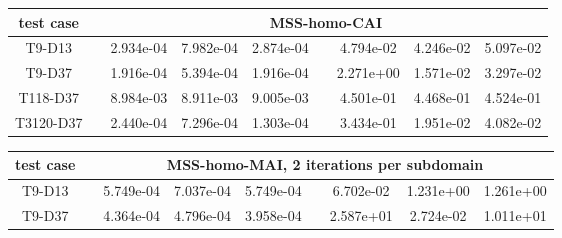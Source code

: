 \begin{table}[h]
\begin{adjustbox}{width=1\textwidth} %
\small
\begin{tabular}{ccccccccc}
\toprule
{test case} && \multicolumn{7}{c}{MSS-homo-CAI}   \\
\midrule
T9-D13       &&  2.934e-04 &  7.982e-04 &  2.874e-04 &&  4.794e-02 &  4.246e-02 &  5.097e-02 \\
T9-D37       &&  1.916e-04 &  5.394e-04 &  1.916e-04 &&  2.271e+00 &  1.571e-02 &  3.297e-02 \\
T118-D37     &&  8.984e-03 &  8.911e-03 &  9.005e-03 &&  4.501e-01 &  4.468e-01 &  4.524e-01 \\
T3120-D37    &&  2.440e-04 &  7.296e-04 &  1.303e-04 &&  3.434e-01 &  1.951e-02 &  4.082e-02 \\
\bottomrule
\end{tabular}
\end{adjustbox}
\begin{adjustbox}{width=1\textwidth} %
\small
\begin{tabular}{ccccccccc}
\toprule
{test case} && \multicolumn{7}{c}{MSS-homo-MAI, 2 iterations per subdomain}   \\
\midrule
T9-D13       &&  5.749e-04 &  7.037e-04 &  5.749e-04 &&  6.702e-02 &  1.231e+00 &  1.261e+00 \\
T9-D37       &&  4.364e-04 &  4.796e-04 &  3.958e-04 &&  2.587e+01 &  2.724e-02 &  1.011e+01 \\

\end{tabular}
\end{adjustbox}
\end{table}
